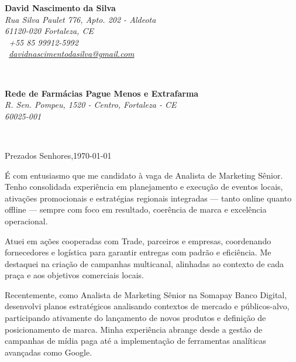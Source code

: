 \begin{commentA}
\sffamily   %
\hfill%
\begin{minipage}[t]{.6\textwidth}
	\raggedleft%
	{\bfseries David Nascimento da Silva}\\[.35ex]
	\small\itshape%
	Rua Silva Paulet 776, Apto. 202 - Aldeota\\
	61120-020 Fortaleza, CE\\[.35ex]
	\Telefon~+55 85 99912-5992\\
	\Letter~\href{mailto:davidnascimentodasilva@gmail.com}{davidnascimentodasilva@gmail.com}
\end{minipage}\\[1em]
%
\begin{minipage}[t]{.4\textwidth}
	\raggedright%
	{\bfseries Rede de Farmácias Pague Menos e Extrafarma}\\[.35ex]
	\small\itshape%
	R. Sen. Pompeu, 1520 - Centro, Fortaleza - CE\\
	60025-001
\end{minipage}
\hfill %
%
\begin{minipage}[t]{.4\textwidth}
\end{minipage}\\[2em]
\raggedright%
Prezados Senhores,\hfill \today\\[1.5em]

\setlength{\parskip}{1.0\baselineskip} %
\setlength{\parindent}{0pt} %

\vspace{1.5em} %
É com entusiasmo que me candidato à vaga de Analista de Marketing Sênior. Tenho consolidada experiência em planejamento e execução de eventos locais, ativações promocionais e estratégias regionais integradas — tanto online quanto offline — sempre com foco em resultado, coerência de marca e excelência operacional.

\noindent Atuei em ações cooperadas com Trade, parceiros e empresas, coordenando fornecedores e logística para garantir entregas com padrão e eficiência. Me destaquei na criação de campanhas multicanal, alinhadas ao contexto de cada praça e aos objetivos comerciais locais.

\noindent Recentemente, como Analista de Marketing Sênior na Somapay Banco Digital, desenvolvi planos estratégicos analisando contextos de mercado e públicos-alvo, participando ativamente do lançamento de novos produtos e definição de posicionamento de marca. Minha experiência abrange desde a gestão de campanhas de mídia paga até a implementação de ferramentas analíticas avançadas como Google.


\end{commentA}
